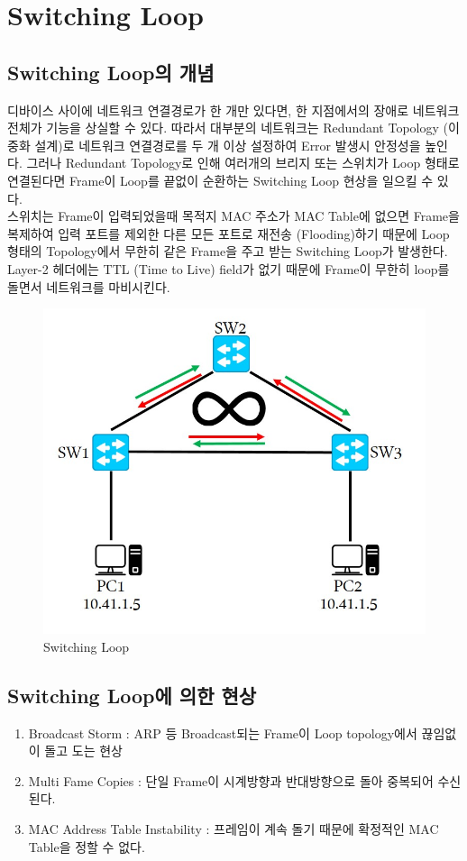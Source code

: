 \section{Switching Loop}
\subsection{Switching Loop의 개념}
    디바이스 사이에 네트워크 연결경로가 한 개만 있다면, 한 지점에서의 장애로 네트워크 전체가 기능을 상실할 수 있다. 따라서 대부분의 네트워크는 Redundant Topology (이중화 설계)로 네트워크 연결경로를 두 개 이상 설정하여 Error 발생시 안정성을 높인다. 그러나 Redundant Topology로 인해 여러개의 브리지 또는 스위치가 Loop 형태로 연결된다면 Frame이 Loop를 끝없이 순환하는 Switching Loop 현상을 일으킬 수 있다. \\
    스위치는 Frame이 입력되었을때 목적지 MAC 주소가 MAC Table에 없으면 Frame을 복제하여 입력 포트를 제외한 다른 모든 포트로 재전송 (Flooding)하기 때문에 Loop 형태의 Topology에서 무한히 같은 Frame을 주고 받는 Switching Loop가 발생한다. Layer-2 헤더에는 TTL (Time to Live) field가 없기 때문에 Frame이 무한히 loop를 돌면서 네트워크를 마비시킨다. \\
    \vspace{-4mm}
    \begin{figure}[!h]\centering
		\includegraphics[width=.65\textwidth]{image/week06/1-1.png}
		\caption{\small Switching Loop}
		\vspace{-10pt}
    \end{figure}
    
\subsection{Switching Loop에 의한 현상}
    \begin{enumerate}
        \item Broadcast Storm : ARP 등 Broadcast되는 Frame이 Loop topology에서 끊임없이 돌고 도는 현상
        \item Multi Fame Copies : 단일 Frame이 시계방향과 반대방향으로 돌아 중복되어 수신된다.
        \item MAC Address Table Instability : 프레임이 계속 돌기 때문에 확정적인 MAC Table을 정할 수 없다.
    \end{enumerate}
\newpage